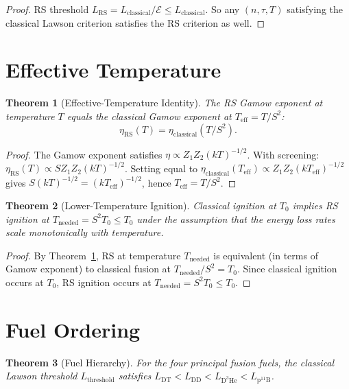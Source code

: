\documentclass[12pt,a4paper]{article}
\newtheorem{theorem}{Theorem}[section]
\theoremstyle{definition}
\theoremstyle{remark}
\begin{document}
\begin{proof}
RS threshold $L_{\mathrm{RS}} = L_{\mathrm{classical}} / \mathcal{E}
\leq L_{\mathrm{classical}}$.  So any $(n,\tau,T)$ satisfying the
classical Lawson criterion satisfies the RS criterion as well.
\end{proof}

\section{Effective Temperature}

\begin{theorem}[Effective-Temperature Identity]
\label{thm:eff-temp}
The RS Gamow exponent at temperature $T$ equals the classical Gamow
exponent at $T_{\mathrm{eff}} = T/S^2$:
\begin{equation}
  \eta_{\mathrm{RS}}(T) = \eta_{\mathrm{classical}}(T/S^2).
\end{equation}
\end{theorem}

\begin{proof}
The Gamow exponent satisfies $\eta \propto Z_1 Z_2 (kT)^{-1/2}$.
With screening: $\eta_{\mathrm{RS}}(T) \propto S Z_1 Z_2 (kT)^{-1/2}$.
Setting equal to $\eta_{\mathrm{classical}}(T_{\mathrm{eff}}) \propto
Z_1 Z_2(kT_{\mathrm{eff}})^{-1/2}$ gives
$S(kT)^{-1/2} = (kT_{\mathrm{eff}})^{-1/2}$,
hence $T_{\mathrm{eff}} = T/S^2$.
\end{proof}

\begin{theorem}[Lower-Temperature Ignition]
\label{thm:low-temp}
Classical ignition at $T_0$ implies RS ignition at
$T_{\mathrm{needed}} = S^2 T_0 \leq T_0$ under the assumption that
the energy loss rates scale monotonically with temperature.
\end{theorem}

\begin{proof}
By Theorem~\ref{thm:eff-temp}, RS at temperature $T_{\mathrm{needed}}$
is equivalent (in terms of Gamow exponent) to classical fusion at
$T_{\mathrm{needed}}/S^2 = T_0$.  Since classical ignition occurs at
$T_0$, RS ignition occurs at $T_{\mathrm{needed}} = S^2 T_0 \leq T_0$.
\end{proof}

\section{Fuel Ordering}

\begin{theorem}[Fuel Hierarchy]
\label{thm:fuel}
For the four principal fusion fuels, the classical Lawson threshold
$L_{\mathrm{threshold}}$ satisfies
$L_{\mathrm{DT}} < L_{\mathrm{DD}} < L_{\mathrm{D^3He}} <
L_{\mathrm{p^{11}B}}$.
\end{theorem}
\end{document}
